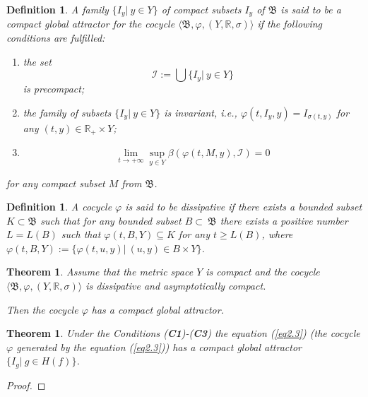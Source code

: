 \documentclass{amsart}%
\newtheorem{theorem}[lemma]{Theorem}
\newtheorem{definition}[lemma]{Definition}
\begin{document}
\begin{definition}\label{defCGA0_1} A family $\{I_{y}|\ y\in Y\}$ of
compact subsets $I_{y}$ of $\mathfrak B$ is said to be a compact
global attractor for the cocycle $\langle \mathfrak
B,\varphi,(Y,\mathbb R,\sigma)\rangle$ if the following conditions
are fulfilled:
\begin{enumerate}
\item the set
\begin{equation}\label{eqCGA1}
\mathcal I :=\bigcup \{I_{y}|\ y\in Y\}\nonumber
\end{equation}
is precompact; \item the family of subsets $\{I_{y}|\ y\in Y\}$ is
invariant, i.e., $\varphi(t,I_{y},y)=I_{\sigma(t,y)}$ for any
$(t,y)\in \mathbb R_{+}\times Y$; \item
\begin{equation}\label{eqCGA2}
\lim\limits_{t\to +\infty}\sup\limits_{y\in
Y}\beta(\varphi(t,M,y),\mathcal I)=0\nonumber
\end{equation}
\end{enumerate}
for any compact subset $M$ from $\mathfrak B$.
\end{definition}


\begin{definition}\label{defCGA1} A cocycle $\varphi$ is said to be
dissipative if there exists a bounded subset $K\subset \mathfrak
B$ such that for any bounded subset $B\subset \ \mathfrak B$ there
exists a positive number $L=L(B)$ such that
$\varphi(t,B,Y)\subseteq K$ for any $t\ge L(B)$, where
$\varphi(t,B,Y):=\{\varphi(t,u,y)|\ (u,y)\in B\times Y\}$.
\end{definition}


\begin{theorem}\label{thCGA1} \cite[Ch.II]{Che_2024} Assume that the metric space $Y$ is
compact and the cocycle $\langle \mathfrak B,\varphi,(Y,\mathbb
R,\sigma)\rangle$ is dissipative and asymptotically compact.

Then the cocycle $\varphi$ has a compact global attractor.
\end{theorem}

\begin{theorem}\label{thCGA2} Under the Conditions
(\textbf{C1})-(\textbf{C3}) the equation (\ref{eq2.3}) (the
cocycle $\varphi$ generated by the equation (\ref{eq2.3})) has a
compact global attractor $\{I_{g}|\ g\in H(f)\}$.
\end{theorem}
\begin{proof}

\end{proof}
\end{document}
